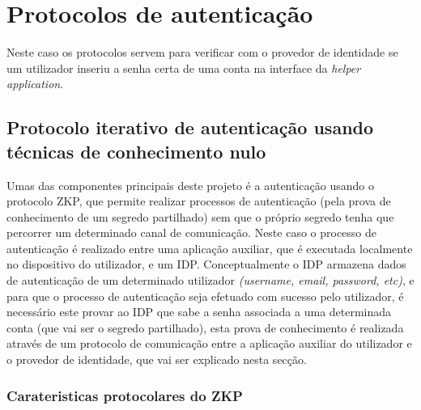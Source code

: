\section{Protocolos de autenticação}
\label{auth_protocols}
\quad Neste caso os protocolos servem para verificar com o provedor de identidade se um utilizador inseriu a senha certa de uma conta na interface da \textit{helper application}.

\subsection{Protocolo iterativo de autenticação usando técnicas de conhecimento nulo}

\quad Umas das componentes principais deste projeto é a autenticação usando o protocolo ZKP, que permite realizar processos de autenticação (pela prova de conhecimento de um segredo partilhado) sem que o próprio segredo tenha que percorrer um determinado canal de comunicação. Neste caso o processo de autenticação é realizado entre uma aplicação auxiliar, que é executada localmente no dispositivo do utilizador, e um IDP. Conceptualmente o IDP armazena dados de autenticação de um determinado utilizador \textit{(username, email, password, etc)}, e para que o processo de autenticação seja efetuado com sucesso pelo utilizador, é necessário este provar ao IDP que sabe a senha associada a uma determinada conta (que vai ser o segredo partilhado), esta prova de conhecimento é realizada através de um protocolo de comunicação entre a aplicação auxiliar do utilizador e o provedor de identidade, que vai ser explicado nesta secção.

\subsubsection{Carateristicas protocolares do ZKP}


